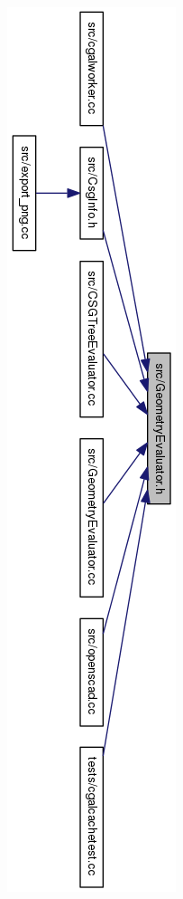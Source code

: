 \begin{figure}
\centering
\includegraphics[height=1.37\columnwidth]{images/GeometryEvaluator_8h__dep__incl}
\caption{}
\label{fig:geometryevaluator8hdepincl}
\end{figure}

